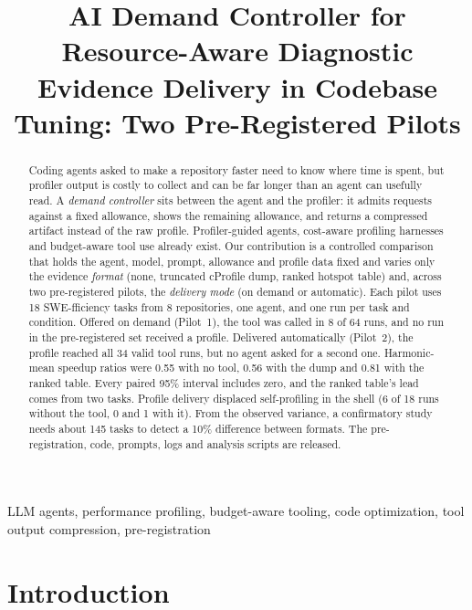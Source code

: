 \documentclass[conference]{IEEEtran}
\begin{document}
\title{AI Demand Controller for Resource-Aware Diagnostic Evidence Delivery in Codebase Tuning: Two Pre-Registered Pilots}

\author{
}

\maketitle

\begin{abstract}
Coding agents asked to make a repository faster need to know where time is
spent, but profiler output is costly to collect and can be far longer than an
agent can usefully read. A \emph{demand controller} sits between the agent and
the profiler: it admits requests against a fixed allowance, shows the remaining
allowance, and returns a compressed artifact instead of the raw profile.
Profiler-guided agents, cost-aware profiling harnesses and budget-aware tool
use already exist. Our contribution is a controlled comparison that holds the
agent, model, prompt, allowance and profile data fixed and varies only the
evidence \emph{format} (none, truncated cProfile dump, ranked hotspot table)
and, across two pre-registered pilots, the \emph{delivery mode} (on demand or
automatic). Each pilot uses 18 SWE-fficiency tasks from 8 repositories, one
agent, and one run per task and condition. Offered on demand (Pilot~1), the
tool was called in 8 of 64 runs, and no run in the pre-registered set
received a profile.
Delivered automatically (Pilot~2), the profile reached all 34 valid tool runs,
but no agent asked for a second one. Harmonic-mean speedup ratios were 0.55
with no tool, 0.56 with the dump and 0.81 with the ranked table. Every paired
95\% interval includes zero, and the ranked table's lead comes from two
tasks. Profile delivery displaced self-profiling in the shell (6 of 18 runs
without the tool, 0 and 1 with it). From the observed variance, a confirmatory
study needs about 145 tasks to detect a 10\% difference between formats. The
pre-registration, code, prompts, logs and analysis scripts are released.
\end{abstract}

\begin{IEEEkeywords}
LLM agents, performance profiling, budget-aware tooling, code optimization,
tool output compression, pre-registration
\end{IEEEkeywords}

\section{Introduction}
\end{document}
